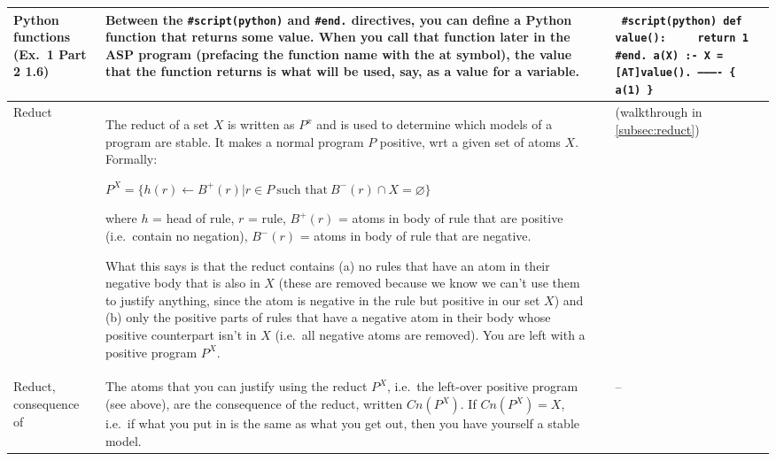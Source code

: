 \documentclass[9pt,a4paper,landscape]{article}
\begin{document}
{\begin{longtable}{Lp{14.5cm}lXX}
Python functions \newline (Ex.\ 1 Part 2 1.6)
& Between the \texttt{\#script(python)} and \texttt{\#end.} directives, you can define a Python function that returns some value.
When you call that function later in the ASP program (prefacing the function name with the at symbol), the value that the function returns is what will be used, say, as a value for a variable.

&& {\small\texttt{%
		\#script(python) \newline
		def value(): \newline
		\mbox{~~~~}return 1 \newline
		\#end. \newline \newline
		a(X) :- X = [AT]value(). \newline
		---------- \newline
		\{ a(1) \}
}} \\ \midrule

Reduct
& The reduct of a set $X$ is written as $P^x$ and is used to determine which models of a program are stable.
It makes a normal program $P$ positive, wrt a given set of atoms $X$.
Formally:
\begin{center}
	$P^X = \{h(r) \leftarrow B^+(r) | r \in P\ \text{such that}\ B^-(r) \cap X = \varnothing \}$
\end{center}
where $h$ = head of rule, $r$ = rule, $B^+(r)$ = atoms in body of rule that are positive (i.e.\ contain no negation), $B^-(r)$ = atoms in body of rule that are negative. \newline

What this says is that the reduct contains (a) no rules that have an atom in their negative body that is also in $X$ (these are removed because we know we can't use them to justify anything, since the atom is negative in the rule but positive in our set $X$) and (b) only the positive parts of rules that have a negative atom in their body whose positive counterpart isn't in $X$ (i.e.\ all negative atoms are removed).
You are left with a positive program $P^X$. \newline

&& (walkthrough in \ref{subsec:reduct}) &\\ \midrule

Reduct, consequence of
& The atoms that you can justify using the reduct $P^X$, i.e.\ the left-over positive program (see above), are the consequence of the reduct, written $Cn(P^X)$.
If $Cn(P^X) = X$, i.e.\ if what you put in is the same as what you get out, then you have yourself a stable model.
&& -- &\\ \midrule



\end{longtable}}
\end{document}
